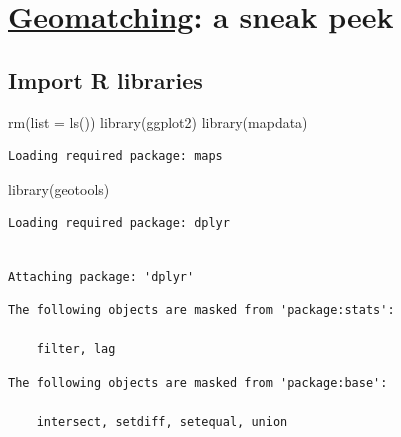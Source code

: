 \documentclass[
  letterpaper,
  DIV=11,
  numbers=noendperiod]{scrartcl}
\author{}
\date{}
\newenvironment{Shaded}{\begin{snugshade}}{\end{snugshade}}
\newcommand{\AttributeTok}[1]{\textcolor[rgb]{0.40,0.45,0.13}{#1}}
\newcommand{\FunctionTok}[1]{\textcolor[rgb]{0.28,0.35,0.67}{#1}}
\newcommand{\NormalTok}[1]{\textcolor[rgb]{0.00,0.23,0.31}{#1}}
\begin{document}


\section{\texorpdfstring{\ul{Geomatching}: a sneak
peek}{Geomatching: a sneak peek}}\label{geomatching-a-sneak-peek}

\subsection{Import R libraries}\label{import-r-libraries}

\begin{Shaded}
\begin{Highlighting}[]
\FunctionTok{rm}\NormalTok{(}\AttributeTok{list =} \FunctionTok{ls}\NormalTok{())}
\FunctionTok{library}\NormalTok{(ggplot2)}
\FunctionTok{library}\NormalTok{(mapdata)}
\end{Highlighting}
\end{Shaded}

\begin{verbatim}
Loading required package: maps
\end{verbatim}

\begin{Shaded}
\begin{Highlighting}[]
\FunctionTok{library}\NormalTok{(geotools)}
\end{Highlighting}
\end{Shaded}

\begin{verbatim}
Loading required package: dplyr
\end{verbatim}

\begin{verbatim}

Attaching package: 'dplyr'
\end{verbatim}

\begin{verbatim}
The following objects are masked from 'package:stats':

    filter, lag
\end{verbatim}

\begin{verbatim}
The following objects are masked from 'package:base':

    intersect, setdiff, setequal, union
\end{verbatim}
\end{document}
